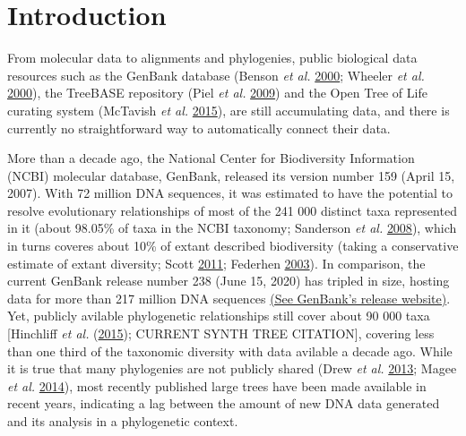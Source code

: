 \documentclass[]{article}
\begin{document}
\hypertarget{introduction}{%
\section{Introduction}\label{introduction}}

From molecular data to alignments and phylogenies, public biological data resources such as the GenBank database (Benson \emph{et al.} \protect\hyperlink{ref-benson2000genbank}{2000}; Wheeler \emph{et al.} \protect\hyperlink{ref-wheeler2000database}{2000}), the TreeBASE repository (Piel \emph{et al.} \protect\hyperlink{ref-piel2009treebase}{2009}) and the Open Tree of Life curating system (McTavish \emph{et al.} \protect\hyperlink{ref-mctavish2015phylesystem}{2015}), are still accumulating data, and there is currently no straightforward way to automatically connect their data.

More than a decade ago, the National Center for Biodiversity Information (NCBI) molecular database, GenBank, released its version number 159 (April 15, 2007). With 72 million DNA sequences, it was estimated to have the potential to resolve evolutionary relationships of most of the 241 000 distinct taxa represented in it (about 98.05\% of taxa in the NCBI taxonomy; Sanderson \emph{et al.} \protect\hyperlink{ref-sanderson2008phylota}{2008}), which in turns coveres about 10\% of extant described biodiversity (taking a conservative estimate of extant diversity; Scott \protect\hyperlink{ref-scott2011ncbi}{2011}; Federhen \protect\hyperlink{ref-federhen2003taxonomy}{2003}).
In comparison, the current GenBank release number 238 (June 15, 2020) has tripled in size, hosting data for more than 217 million DNA sequences \href{https://ftp.ncbi.nih.gov/genbank/gbrel.txt}{(See GenBank's release website)}. Yet, publicly avilable phylogenetic relationships still cover about 90 000 taxa {[}Hinchliff \emph{et al.} (\protect\hyperlink{ref-hinchliff2015synthesis}{2015}); CURRENT SYNTH TREE CITATION{]}, covering less than one third of the taxonomic diversity with data avilable a decade ago. While it is true that many phylogenies are not publicly shared (Drew \emph{et al.} \protect\hyperlink{ref-drew2013lost}{2013}; Magee \emph{et al.} \protect\hyperlink{ref-magee2014dawn}{2014}), most recently published large trees have been made available in recent years, indicating a lag between the amount of new DNA data generated and its analysis in a phylogenetic context.
\end{document}

